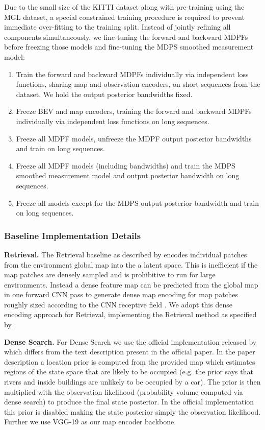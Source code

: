         Due to the small size of the KITTI dataset along with pre-training using the MGL dataset, a special constrained training procedure is required to prevent immediate over-fitting to the training split.  Instead of jointly refining all components simultaneously, we fine-tuning the forward and backward MDPFs before freezing those models and fine-tuning the MDPS smoothed measurement model:
        \begin{enumerate}   
            \item Train the forward and backward MDPFs individually via independent loss functions, sharing map and observation encoders, on short sequences from the dataset. We hold the output posterior bandwidths fixed.
            \item Freeze BEV and map encoders, training the forward and backward MDPFs individually via independent loss functions on long sequences.           
            \item Freeze all MDPF models, unfreeze the MDPF output posterior bandwidths and train on long sequences.
            \item Freeze all MDPF models (including bandwidths) and train the MDPS smoothed measurement model and output posterior bandwidth on long sequences.
            \item Freeze all models except for the MDPS output posterior bandwidth and train on long sequences.
        \end{enumerate}

    \subsubsection{Baseline Implementation Details}
    
        \textbf{Retrieval.} The Retrieval \cite{noe2020eccv} baseline as described by \citet{noe2020eccv} encodes individual patches from the environment global map into the a latent space.  This is inefficient if the map patches are densely sampled and is prohibitive to run for large environments.  Instead a dense feature map can be predicted from the global map in one forward CNN pass to generate dense map encoding for map patches roughly sized according to the CNN receptive field \cite{sarlin2023orienternet}. We adopt this dense encoding approach for Retrieval, implementing the Retrieval method as specified by \citet{sarlin2023orienternet}.
                
        \textbf{Dense Search.} For Dense Search we use the official implementation released by \citet{sarlin2023orienternet} which differs from the text description present in the official paper. In the paper description a location prior is computed from the provided map which estimates regions of the state space that are likely to be occupied (e.g. the prior says that rivers and inside buildings are unlikely to be occupied by a car).  The prior is then multiplied with the observation likelihood (probability volume computed via dense search) to produce the final state posterior. In the official implementation this prior is disabled making the state posterior simply the observation likelihood. Further we use VGG-19 \cite{DBLP:journals/corr/SimonyanZ14a_VGG} as our map encoder backbone.

